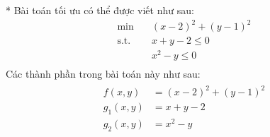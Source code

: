 \begin{solution}{*}
    Bài toán tối ưu có thể được viết như sau:
    \begin{equation}
        \begin{aligned}
            \min \quad & (x-2)^2 + (y-1)^2\\
            \textrm{s.t.} \quad & x + y - 2 \leq 0\\
              & x^2 - y \leq 0    \\
        \end{aligned}
    \end{equation}
    Các thành phần trong bài toán này như sau:
    \begin{align}
        \begin{aligned}
            f(x,y) &= (x-2)^2 + (y-1)^2\\
            g_1(x,y) &= x + y - 2\\
            g_2(x, y) &= x^2 - y 
        \end{aligned}
    \end{align}
    

\end{solution}
